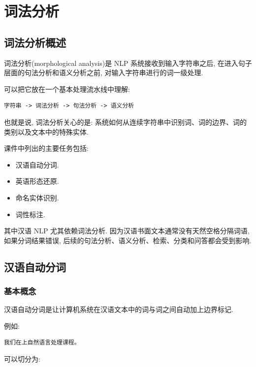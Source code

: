 \chapter{词法分析}


\section{词法分析概述}


词法分析(morphological analysis)是 NLP 系统接收到输入字符串之后, 在进入句子层面的句法分析和语义分析之前, 对输入字符串进行的词一级处理.

可以把它放在一个基本处理流水线中理解:

\begin{Verbatim}[breaklines=true,breakanywhere=true,fontsize=\small]
字符串 -> 词法分析 -> 句法分析 -> 语义分析
\end{Verbatim}

也就是说, 词法分析关心的是:
系统如何从连续字符串中识别词、词的边界、词的类别以及文本中的特殊实体.

课件中列出的主要任务包括:

\begin{itemize}
\item 汉语自动分词.
\item 英语形态还原.
\item 命名实体识别.
\item 词性标注.
\end{itemize}

其中汉语 NLP 尤其依赖词法分析.
因为汉语书面文本通常没有天然空格分隔词语, 如果分词结果错误, 后续的句法分析、语义分析、检索、分类和问答都会受到影响.

\section{汉语自动分词}


\subsection{基本概念}


汉语自动分词是让计算机系统在汉语文本中的词与词之间自动加上边界标记.

例如:

\begin{Verbatim}[breaklines=true,breakanywhere=true,fontsize=\small]
我们在上自然语言处理课程。
\end{Verbatim}

可以切分为:

